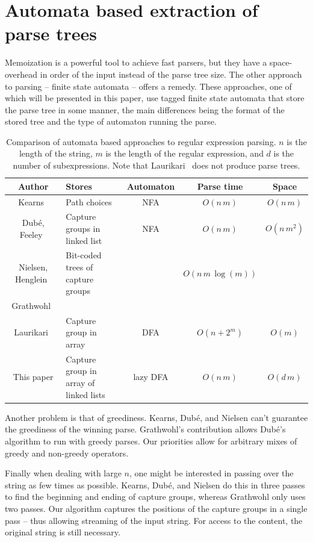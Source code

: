 \documentclass[11pt]{Thesis}
\theoremstyle{definition}
\newcommand{\seclabel}[1]{\label{sec:#1}}
\begin{document}
\section{Automata based extraction of parse trees}\seclabel{parse-trees-related}
Memoization is a powerful tool to achieve fast parsers, but they have a 
space-overhead in order of the input instead of the parse tree size. The 
other approach to parsing -- finite state automata -- offers a remedy. These 
approaches, one of which will be presented in this paper, use tagged finite 
state automata that store the parse tree in some manner, the main differences 
being the format of the stored tree and the type of automaton running the parse.

\begin{table}
\begin{tabular}{c|>{\centering}m{3cm}ccc}
  Author & Stores & Automaton & Parse time & Space \\
  \hline
  \hline
  Kearns~\cite{Kear91a}& Path choices & NFA & $O(n\,m)$ & $O(n\, m)$ \\
  \hline
  Dub\'e, Feeley~\cite{Dube00a}& Capture groups in linked 
  list & NFA & $O(n\,m)$ & $O(n\, m^2)$\\
  Nielsen, Henglein~\cite{Niel11a} & Bit-coded trees of capture groups  & & $O(n\, m\, \log(m))$ \\
  Grathwohl~\cite{Grat13a} \\
  \hline
  Laurikari~\cite{Laur00a}& Capture group in array & DFA & 
  $O(n+2^m)$ & $O(m)$\\
  This paper & Capture group in array of linked lists & lazy DFA 
  & $O(n\, m)$ & $O(d\, m)$ \\
\end{tabular}
\caption{Comparison of automata based approaches to regular expression 
parsing. $n$ is the length of the string, $m$ is the length of the regular 
expression, and $d$ is the number of subexpressions. Note that 
Laurikari~\cite{Laur00a} does not produce parse trees.}
\end{table}

Another problem is that of greediness. Kearns, Dub\'e, and Nielsen can't 
guarantee the greediness of the winning parse. Grathwohl's contribution 
allows Dub\'e's algorithm to run with greedy parses. Our priorities allow for 
arbitrary mixes of greedy and non-greedy operators.

Finally when dealing with large $n$, one might be interested in passing over 
the string as few times as possible. Kearns, Dub\'e, and Nielsen do this in 
three passes to find the beginning and ending of capture groups, whereas 
Grathwohl only uses two passes. Our algorithm captures the positions of the 
capture groups in a single pass -- thus allowing streaming of the input 
string. For access to the content, the original string is still necessary.
\end{document}
